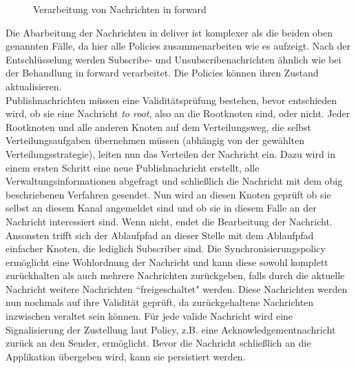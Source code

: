 \begin{figure}[htbp]
\centering
{}
\caption{Verarbeitung von Nachrichten in forward}
\label{fig:processing_forward}
\end{figure}

Die Abarbeitung der Nachrichten in deliver ist komplexer als die beiden oben genannten Fälle, da hier alle Policies zusammenarbeiten wie es  aufzeigt. Nach der Entschlüsselung werden Subscribe- und Unsubscribenachrichten ähnlich wie bei der Behandlung in forward verarbeitet. Die Policies können ihren Zustand aktualisieren.\\
Publishnachrichten müssen eine Validitätsprüfung bestehen, bevor entschieden wird, ob sie eine Nachricht \emph{to root}, also an die Rootknoten sind, oder nicht. Jeder Rootknoten und alle anderen Knoten auf dem Verteilungsweg, die selbst Verteilungsaufgaben übernehmen müssen (abhängig von der gewählten Verteilungsstrategie), leiten nun das Verteilen der Nachricht ein. Dazu wird in einem ersten Schritt eine neue Publishnachricht erstellt, alle Verwaltungsinformationen abgefragt und schließlich die Nachricht mit dem obig beschriebenen Verfahren gesendet. Nun wird an diesen Knoten geprüft ob sie selbst an diesem Kanal angemeldet sind und ob sie in diesem Falle an der Nachricht interessiert sind. Wenn nicht, endet die Bearbeitung der Nachricht. Ansonsten trifft sich der Ablaufpfad an dieser Stelle mit dem Ablaufpfad einfacher Knoten, die lediglich Subscriber sind. Die Synchronisierungspolicy ermöglicht eine Wohlordnung der Nachricht und kann diese sowohl komplett zurückhalten als auch mehrere Nachrichten zurückgeben, falls durch die aktuelle Nachricht weitere Nachrichten ``freigeschaltet" werden. Diese Nachrichten werden nun nochmals auf ihre Validität geprüft, da zurückgehaltene Nachrichten inzwischen veraltet sein können. Für jede valide Nachricht wird eine Signalisierung der Zustellung laut Policy, z.B. eine Acknowledgementnachricht zurück an den Sender, ermöglicht. Bevor die Nachricht schließlich an die Applikation übergeben wird, kann sie persistiert werden.

